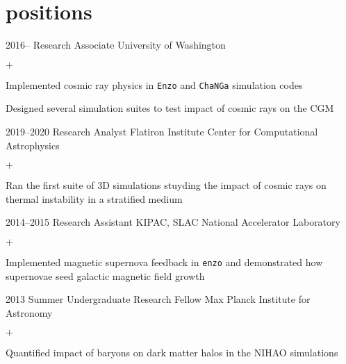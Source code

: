 \documentclass[]{luger-cv} %
\begin{document}
\section{positions}
\begin{entrylist}


\entry
{2016--}
{Research Associate}
{University of Washington}
{%
\vspace{-1em}
\begin{list}{$+$}{\cvlist}
\item Implemented cosmic ray physics in \texttt{Enzo} and \texttt{ChaNGa} simulation codes
\item Designed several simulation suites to test impact of cosmic rays on the CGM
\end{list}
}


\entry
{2019--2020}
{Research Analyst}
{Flatiron Institute Center for Computational Astrophysics}
{%
\vspace{-1em}
\begin{list}{$+$}{\cvlist}
\item Ran the first suite of 3D simulations stuyding the impact of cosmic rays on thermal instability in a stratified medium
\end{list}
}


\entry
{2014--2015}
{Research Assistant}
{KIPAC, SLAC National Accelerator Laboratory}
{%
\vspace{-1em}
\begin{list}{$+$}{\cvlist}
\item Implemented magnetic supernova feedback in \texttt{enzo} and demonstrated how supernovae seed galactic magnetic field growth
\end{list}
}


\ifdefined \onepage \else
\entry
{2013}
{Summer Undergraduate Research Fellow}
{Max Planck Institute for Astronomy}
{%
\vspace{-1em}
\begin{list}{$+$}{\cvlist}
\item Quantified impact of baryons on dark matter halos in the NIHAO simulations
\end{list}
}


\end{entrylist}
\end{document}
